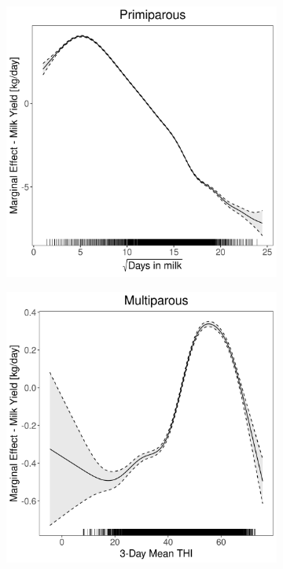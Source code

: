 \begin{figure}[H]
\begin{subfigure}[b]{0.45\textwidth}
    \end{subfigure}
    \hspace{0.05\textwidth} %
    \begin{subfigure}[b]{0.45\textwidth}
        \centering
        \includegraphics[width=\textwidth]{thesis/figures/models/milk/full/si_milk_full/si_milk_full_marginal_dim_milk_primi.png}
    \end{subfigure}
    \begin{subfigure}[b]{0.45\textwidth}
        \centering
        \includegraphics[width=\textwidth]{thesis/figures/models/milk/full/si_milk_full/si_milk_full_marginal_thi_milk_multi.png}

\end{subfigure}
\end{figure}
